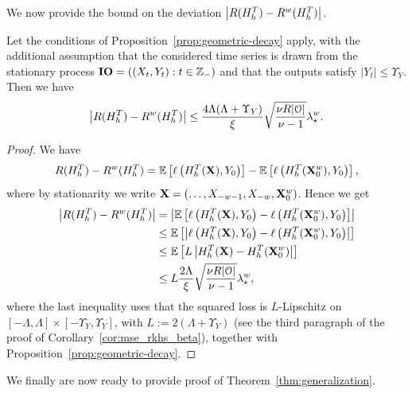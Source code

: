 We now provide the bound on the deviation $\left| R(H^T_h) - R^w(H^T_h) \right|$.
\begin{corollary}\label{cor:deviation-window-risk-true}
    Let the conditions of Proposition~\ref{prop:geometric-decay} apply, with the additional assumption that the considered time series is drawn from the stationary process $\mathbf{IO} = ((X_t,Y_t): t \in {\mathbb{Z}}_-)$ and that the outputs satisfy $|Y_t| \leq \Upsilon_Y$. Then we have
    \begin{equation}
        \left| R(H^T_h) - R^w(H^T_h) \right| \leq  \frac{4 \Lambda (\Lambda + \Upsilon_Y)}{\xi} \sqrt{\frac{\nu R |{\mathcal{O}}|}{\nu - 1}} \lambda_\star^w.
    \end{equation}
\end{corollary}
\begin{proof}
    We have
    \begin{equation*}
        R(H^T_h) - R^w(H^T_h) = \mathbb{E}\left[\ell\left(H^T_h({\mathbf{X}}), Y_0\right)\right] - \mathbb{E}\left[\ell\left(H^T_h({\mathbf{X}}^w_0), Y_0\right)\right],
    \end{equation*}
    where by stationarity we write ${\mathbf{X}} = (\ldots, X_{-w-1}, X_{-w}, {\mathbf{X}}^w_0)$. Hence we get
    \begin{equation*}
    \begin{aligned}
        \left| R(H^T_h) - R^w(H^T_h) \right| &= \left| \mathbb{E}\left[\ell\left(H^T_h({\mathbf{X}}), Y_0\right) - \ell\left(H^T_h({\mathbf{X}}^w_0), Y_0\right)\right] \right|\\
        & \leq \mathbb{E}\left[\left| \ell\left(H^T_h({\mathbf{X}}), Y_0\right) - \ell\left(H^T_h({\mathbf{X}}^w_0), Y_0\right) \right|\right]\\
        &\leq \mathbb{E}\left[L \left| H^T_h({\mathbf{X}}) - H^T_h({\mathbf{X}}^w_0) \right|\right]\\
        &\leq L \frac{2 \Lambda}{\xi} \sqrt{\frac{\nu R |{\mathcal{O}}|}{\nu - 1}} \lambda_\star^w,
    \end{aligned}
    \end{equation*}
    where the last inequality uses that the squared loss is $L$-Lipschitz on $[-\Lambda,\Lambda]\times[-\Upsilon_Y,\Upsilon_Y]$, with $L := 2 (\Lambda + \Upsilon_Y)$ (see the third paragraph of the proof of Corollary~\ref{cor:mse_rkhs_beta}), together with Proposition~\ref{prop:geometric-decay}.
\end{proof}


We finally are now ready to provide proof of Theorem~\ref{thm:generalization}.

